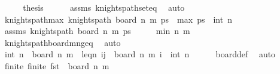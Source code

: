 \begin{isabellebody}
\ \ \isamarkupfalse%
\ \isamarkupfalse%
\ {\isacharquery}{\kern0pt}thesis\isanewline
\ \ \ \ \isamarkupfalse%
\ assms\ knights{\isacharunderscore}{\kern0pt}path{\isacharunderscore}{\kern0pt}set{\isacharunderscore}{\kern0pt}eq\ \isamarkupfalse%
\ auto\isanewline
{}\isamarkupfalse%
%
\endisatagproof
{\isafoldproof}%
%
\isadelimproof
\isanewline
%
\endisadelimproof
\isanewline
{}\isamarkupfalse%
\ knights{\isacharunderscore}{\kern0pt}path{\isacharunderscore}{\kern0pt}max{}{\isacharcolon}{\kern0pt}\ {\isachardoublequoteopen}knights{\isacharunderscore}{\kern0pt}path\ {\isacharparenleft}{\kern0pt}board\ n\ m{\isacharparenright}{\kern0pt}\ ps\ {\isasymLongrightarrow}\ max{}\ ps\ {\isacharequal}{\kern0pt}\ int\ n{\isachardoublequoteclose}\isanewline
%
\isadelimproof
%
\endisadelimproof
%
\isatagproof
{}\isamarkupfalse%
\ {\isacharminus}{\kern0pt}\isanewline
\ \ \isamarkupfalse%
\ assms{\isacharcolon}{\kern0pt}\ {\isachardoublequoteopen}knights{\isacharunderscore}{\kern0pt}path\ {\isacharparenleft}{\kern0pt}board\ n\ m{\isacharparenright}{\kern0pt}\ ps{\isachardoublequoteclose}\isanewline
\ \ \isamarkupfalse%
\ \isamarkupfalse%
\ {\isachardoublequoteopen}min\ n\ m\ {\isasymge}\ {}{\isachardoublequoteclose}\isanewline
\ \ \ \ \isamarkupfalse%
\ knights{\isacharunderscore}{\kern0pt}path{\isacharunderscore}{\kern0pt}board{\isacharunderscore}{\kern0pt}m{\isacharunderscore}{\kern0pt}n{\isacharunderscore}{\kern0pt}geq{\isacharunderscore}{\kern0pt}{}\ \isamarkupfalse%
\ auto\isanewline
\ \ \isamarkupfalse%
\ \isamarkupfalse%
\ {\isachardoublequoteopen}{\isacharparenleft}{\kern0pt}int\ n{\isacharcomma}{\kern0pt}{}{\isacharparenright}{\kern0pt}\ {\isasymin}\ board\ n\ m{\isachardoublequoteclose}\ \ leq{\isacharunderscore}{\kern0pt}n{\isacharcolon}{\kern0pt}\ {\isachardoublequoteopen}{\isasymforall}{\isacharparenleft}{\kern0pt}i{\isacharcomma}{\kern0pt}j{\isacharparenright}{\kern0pt}\ {\isasymin}\ board\ n\ m{\isachardot}{\kern0pt}\ i\ {\isasymle}\ int\ n{\isachardoublequoteclose}\isanewline
\ \ \ \ \isamarkupfalse%
\ board{\isacharunderscore}{\kern0pt}def\ \isamarkupfalse%
\ auto\isanewline
\ \ \isamarkupfalse%
\ \isamarkupfalse%
\ finite{\isacharcolon}{\kern0pt}\ {\isachardoublequoteopen}finite\ {\isacharparenleft}{\kern0pt}{\isacharparenleft}{\kern0pt}fst{\isacharparenright}{\kern0pt}\ {\isacharbackquote}{\kern0pt}\ board\ n\ m{\isacharparenright}{\kern0pt}{\isachardoublequoteclose}\ \ \isanewline

\end{isabellebody}
